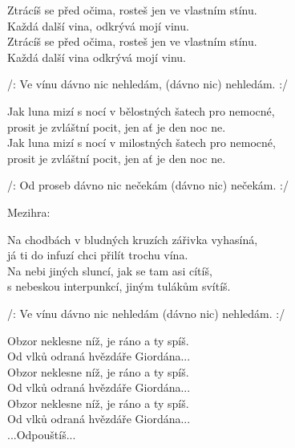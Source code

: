 
\ve{}
Ztrácíš se před očima, rosteš jen ve vlastním stínu.\\
Každá další vina, odkrývá mojí vinu.\\
Ztrácíš se před očima, rosteš jen ve vlastním stínu.\\
Každá další vina odkrývá mojí vinu.

\re{*:}
/: Ve vínu dávno nic nehledám, (dávno nic) nehledám. :/

\cho{}
Jak luna mizí s nocí v bělostných šatech pro nemocné,\\
prosit je zvláštní pocit, jen ať je den noc ne.\\
Jak luna mizí s nocí v milostných šatech pro nemocné,\\
prosit je zvláštní pocit, jen ať je den noc ne.

\re{*:}
/: Od proseb dávno nic nečekám (dávno nic) nečekám. :/

\re{}
Mezihra:\\

\ve 
Na chodbách v bludných kruzích zářivka vyhasíná,\\
já ti do infuzí chci přilít trochu vína.\\
Na nebi jiných sluncí, jak se tam asi cítíš,\\
s nebeskou interpunkcí, jiným tulákům svítíš.

\re{*:}
/: Ve vínu dávno nic nehledám (dávno nic) nehledám. :/

\cho{}

\re{*:}
Obzor neklesne níž, je ráno a ty spíš.\\
Od vlků odraná hvězdáře Giordána...\\
Obzor neklesne níž, je ráno a ty spíš.\\
Od vlků odraná hvězdáře Giordána...\\
Obzor neklesne níž, je ráno a ty spíš.\\
Od vlků odraná hvězdáře Giordána... \\
...Odpouštíš...

\esong{}